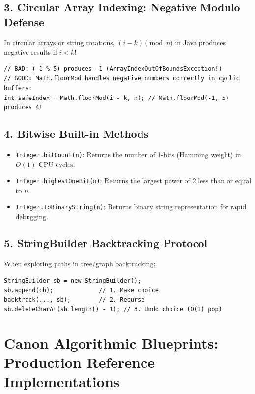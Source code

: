 \documentclass[10pt,journal,compsoc,onecolumn]{IEEEtran}
\begin{document}
\subsection{3. Circular Array Indexing: Negative Modulo Defense}
In circular arrays or string rotations, $(i - k) \pmod n$ in Java produces negative results if $i < k$!
\begin{verbatim}
// BAD: (-1 % 5) produces -1 (ArrayIndexOutOfBoundsException!)
// GOOD: Math.floorMod handles negative numbers correctly in cyclic buffers:
int safeIndex = Math.floorMod(i - k, n); // Math.floorMod(-1, 5) produces 4!
\end{verbatim}

\subsection{4. Bitwise Built-in Methods}
\begin{itemize}
    \item \texttt{Integer.bitCount(n)}: Returns the number of 1-bits (Hamming weight) in $O(1)$ CPU cycles.
    \item \texttt{Integer.highestOneBit(n)}: Returns the largest power of 2 less than or equal to $n$.
    \item \texttt{Integer.toBinaryString(n)}: Returns binary string representation for rapid debugging.
\end{itemize}

\subsection{5. StringBuilder Backtracking Protocol}
When exploring paths in tree/graph backtracking:
\begin{verbatim}
StringBuilder sb = new StringBuilder();
sb.append(ch);             // 1. Make choice
backtrack(..., sb);        // 2. Recurse
sb.deleteCharAt(sb.length() - 1); // 3. Undo choice (O(1) pop)
\end{verbatim}

\section{Canon Algorithmic Blueprints: Production Reference Implementations}
\label{sec:blueprints}
\end{document}
